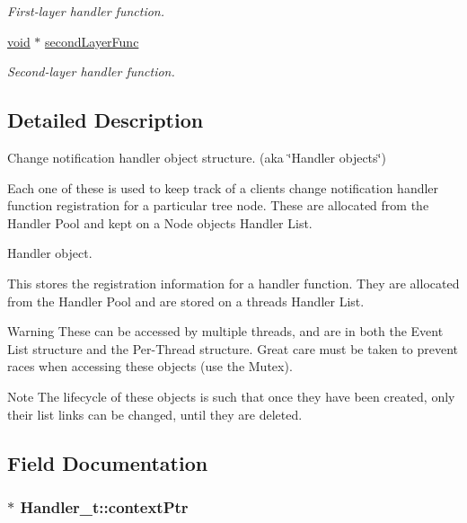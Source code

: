 \begin{DoxyCompactItemize}
\begin{DoxyCompactList}\small\item\em First-\/layer handler function. \end{DoxyCompactList}\item 
\hyperlink{_t_e_m_p_l_a_t_e__cdef_8h_ac9c84fa68bbad002983e35ce3663c686}{void} $\ast$ \hyperlink{struct_handler__t_abbac75568cc8738ec575ad636389558a}{second\+Layer\+Func}
\begin{DoxyCompactList}\small\item\em Second-\/layer handler function. \end{DoxyCompactList}\end{DoxyCompactItemize}


\subsection{Detailed Description}
Change notification handler object structure. (aka \char`\"{}\+Handler objects\char`\"{})

Each one of these is used to keep track of a client\textquotesingle{}s change notification handler function registration for a particular tree node. These are allocated from the Handler Pool and kept on a Node object\textquotesingle{}s Handler List.

Handler object.

This stores the registration information for a handler function. They are allocated from the Handler Pool and are stored on a thread\textquotesingle{}s Handler List.

\begin{DoxyWarning}{Warning}
These can be accessed by multiple threads, and are in both the Event List structure and the Per-\/\+Thread structure. Great care must be taken to prevent races when accessing these objects (use the Mutex).
\end{DoxyWarning}
\begin{DoxyNote}{Note}
The lifecycle of these objects is such that once they have been created, only their list links can be changed, until they are deleted. 
\end{DoxyNote}


\subsection{Field Documentation}
\subsubsection[{\texorpdfstring{context\+Ptr}{contextPtr}}]{ $\ast$ Handler\+\_\+t\+::context\+Ptr}\hypertarget{struct_handler__t_a5a9faf6c8fe187387c62ddbef6311aa3}{}\label{struct_handler__t_a5a9faf6c8fe187387c62ddbef6311aa3}



